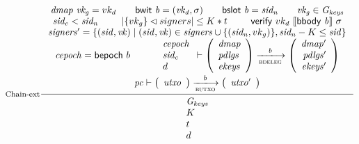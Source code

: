 \begin{figure}
  \begin{equation}
    \label{eq:rule:chain-extension}
    \inference[Chain-ext]
    {\var{dmap}~\var{vk_g} = vk_d & \bwit{b} = (\var{vk_d}, \sigma)
      & \bslot{b} = \var{sid_n} & \var{vk_g} \in \Gkeys\\
      \var{sid_c} < \var{sid_n} & \size{\{vk_g\} \restrictdom signers} \leq K * t &
      \verify{vk_d}{\serialised{\bbody{b}}}{\sigma} \\
      \var{signers'} =
         \{ (\var{sid}, \var{vk})
          \mid  (\var{sid}, \var{vk}) \in \var{signers} \cup \{(\var{sid_n}, vk_g)\}
          , \var{sid_n} - K \leq \var{sid} \}\\
      \var{cepoch} = \fun{bepoch}~b &
      {\begin{array}{l}
         \var{cepoch}\\
         \var{sid_c}\\
         d
       \end{array}}
      \vdash
      {
        \left(
          \begin{array}{l}
            \var{dmap}\\
            \var{pdlgs}\\
            \var{ekeys}
          \end{array}
        \right)
      }
      \trans{bdeleg}{b}
      {
        \left(
          \begin{array}{r}
            \var{dmap'}\\
            \var{pdlgs'}\\
            \var{ekeys'}
          \end{array}
        \right)
      }
      \\ ~ \\
      {
        \var{pc} \vdash
        \left(
          \begin{array}{l}
            \var{utxo}\\
          \end{array}
        \right)
      }
      \trans{butxo}{b}
      {
        \left(
          \begin{array}{r}
            \var{utxo'}\\
          \end{array}
        \right)
      }
    }
    {
      {\begin{array}{l}
         \Gkeys\\
         K\\
         t\\
         d\\

\end{array}}}
\end{equation}
\end{figure}
